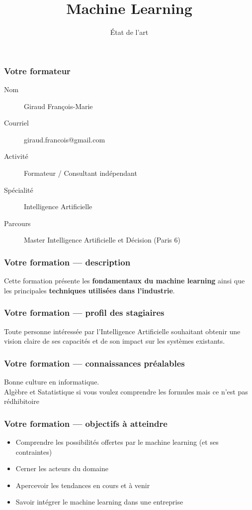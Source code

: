 \documentclass{formation}
\title{Machine Learning}
\subtitle{État de l'art}
\begin{document}
\maketitle

\begin{frame}
  \frametitle{Votre formateur}
  \begin{description}
  \item[Nom] Giraud François-Marie
  \item[Courriel] giraud.francois@gmail.com
  \item[Activité] Formateur / Consultant indépendant
  \item[Spécialité] Intelligence Artificielle
  \item[Parcours] Master Intelligence Artificielle et Décision (Paris 6)
  \end{description}
\end{frame}

\begin{frame}
  \frametitle{Votre formation — description}

  Cette formation présente les \textbf{fondamentaux du machine learning} ainsi que les principales \textbf{techniques utilisées dans l’industrie}.
\end{frame}

\begin{frame}
  \frametitle{Votre formation — profil des stagiaires}
  Toute personne intéressée par l'Intelligence Artificielle souhaitant obtenir une vision claire de ses capacités et de son impact sur les systèmes existants.
\end{frame}

\begin{frame}
  \frametitle{Votre formation — connaissances préalables}
  Bonne culture en informatique. \\
  Algèbre et Satatistique si vous voulez comprendre les formules mais ce n'est pas rédhibitoire
\end{frame}

\begin{frame}
  \frametitle{Votre formation — objectifs à atteindre}
  \begin{itemize}
  \item Comprendre les possibilités offertes par le machine learning (et ses contraintes)
  \item Cerner les acteurs du domaine
  \item Apercevoir les tendances en cours et à venir
  \item Savoir intégrer le machine learning dans une entreprise
  \end{itemize}
\end{frame}
\end{document}
